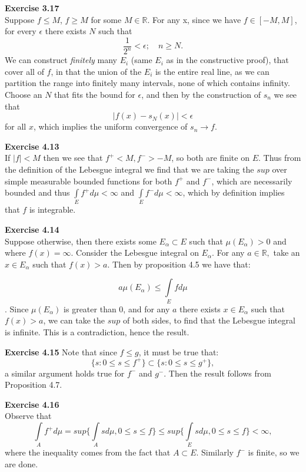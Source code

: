 \documentclass[UTF8]{article}
\begin{document}
\medskip
\noindent \textbf{Exercise 3.17} \\
Suppose $f \leq M$, $f \geq M$ for some $M  \in \mathbb{R}$. For any x, since we have $f \in [-M, M]$, for every $\epsilon$ there exists $N$ such that $$\frac{1}{2^n} <\epsilon; \quad n \geq N.$$ We can construct \textit{finitely} many $E_i$ (same $E_i$ as in the constructive proof), that cover all of $f$, in that the union of the $E_i$ is the entire real line, as we can partition the range into finitely many intervals, none of which contains infinity. Choose an $N$ that fits the bound for $\epsilon$, and then by the construction of $s_n$ we see that $$|f(x) - s_N(x)| < \epsilon$$ for all $x$, which implies the uniform convergence of $s_n \to f$. 

\medskip
\noindent \textbf{Exercise 4.13} \\
If $|f| < M$ then we see that $f^+ < M, f^- > -M$, so both are finite on $E.$ Thus from the definition of the Lebesgue integral we find that we are taking the $sup$ over simple measurable bounded functions for both $f^+$ and $f^-$, which are necessarily bounded and thus $\int\limits_{E} f^+ d\mu < \infty$ and $\int\limits_{E} f^- d\mu < \infty$, which by definition implies that $f$ is integrable. 

\medskip
\noindent \textbf{Exercise 4.14} \\
Suppose otherwise, then there exists some $E_\alpha \subset E$ such that $\mu(E_\alpha) >0$ and where $f(x) = \infty$. Consider the Lebesgue integral on $E_\alpha$. For any $a \in \mathbb{R},$ take an $x \in E_\alpha$ such that $f(x) > a$. Then by proposition 4.5 we have that:

$$a\mu(E_\alpha) \leq \int\limits_E f d\mu$$. Since $\mu(E_\alpha)$ is greater than 0, and for any $a$ there exists $x \in E_\alpha$ such that $f(x) > a$, we can take the $sup$ of both sides, to find that the Lebesgue integral is infinite. This is a contradiction, hence the result.

\medskip
\noindent \textbf{Exercise 4.15}
Note that since $f \leq g$, it must be true that:
$$\{s: 0 \leq s \leq f^+\} \subset \{s: 0 \leq s \leq g^+\},$$
a similar argument holds true for $f^-$ and $g^-$. Then the result follows from Proposition 4.7.

\medskip
\noindent \textbf{Exercise 4.16} \\
Observe that 
$$\int\limits_A f^+ d\mu = sup\{\int\limits_A  s d\mu, 0 \leq s \leq f\} \leq sup\{\int\limits_E  s d\mu, 0 \leq s \leq f\} < \infty,$$ where the inequality comes from the fact that $A \subset E$. Similarly $f^-$ is finite, so we are done.
\end{document}
